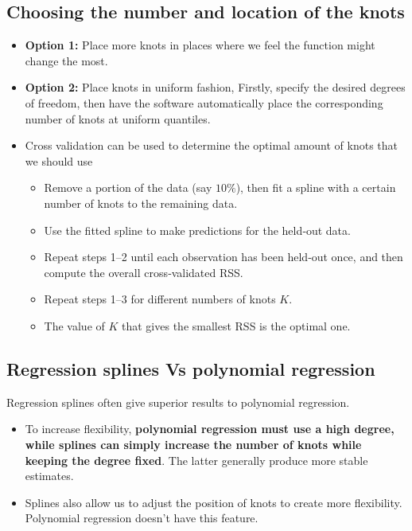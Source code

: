 \documentclass{article}
\begin{document}
\subsection{Choosing the number and location of the knots}
\begin{itemize}
    \item \textbf{Option 1:} Place more knots in places where we feel the function might change the most.
    \item \textbf{Option 2:} Place knots in uniform fashion, Firstly, specify the desired degrees of freedom, then have the software automatically place the corresponding number of knots at uniform quantiles.
    \item Cross validation can be used to determine the optimal amount of knots that we should use
    \begin{itemize}
        \item[1.] Remove a portion of the data (say $10\%$), then fit a spline with a certain number of knots to the remaining data.  
        \item[2.] Use the fitted spline to make predictions for the held‐out data.
        \item[3.] Repeat steps 1–2 until each observation has been held‐out once, and then compute the overall cross‐validated RSS.
        \item[4.] Repeat steps 1–3 for different numbers of knots $K$.
        \item[5.] The value of $K$ that gives the smallest RSS is the optimal one.
    \end{itemize}
\end{itemize}

\subsection{Regression splines Vs polynomial regression}
Regression splines often give superior results to polynomial regression.

\begin{itemize}
  \item To increase flexibility, \textbf{polynomial regression must use a high degree, while splines can simply increase the number of knots while keeping the degree fixed}. The latter generally produce more stable estimates.
  \item Splines also allow us to adjust the position of knots to create more flexibility. Polynomial regression doesn’t have this feature.
\end{itemize}
\end{document}
